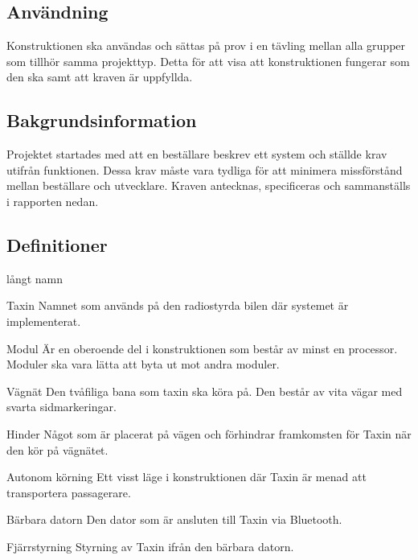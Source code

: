 \documentclass[kravspec/krav.tex]{subfiles}
\begin{document}
\subsection{Användning}
Konstruktionen ska användas och sättas på prov i en tävling mellan alla grupper som tillhör samma projekttyp. Detta för att visa att konstruktionen fungerar som den ska samt att kraven är uppfyllda.

\subsection{Bakgrundsinformation}
Projektet startades med att en beställare beskrev ett system och ställde krav
utifrån funktionen. Dessa krav måste vara tydliga för att minimera missförstånd
mellan beställare och utvecklare. Kraven antecknas, specificeras och
sammanställs i rapporten nedan.

\subsection{Definitioner}
\begin{labeling}{långt namn}
    \item[Taxin] Namnet som används på den radiostyrda bilen där systemet är
    implementerat.
    \item[Modul] Är en oberoende del i konstruktionen som består av minst en
    processor. Moduler ska vara lätta att byta ut mot andra moduler.
    \item[Vägnät] Den tvåfiliga bana som taxin ska köra på. Den består av vita
    vägar med svarta sidmarkeringar.
    \item[Hinder] Något som är placerat på vägen och förhindrar framkomsten för
    Taxin när den kör på vägnätet.
    \item[Autonom körning] Ett visst läge i konstruktionen där Taxin är menad
    att transportera passagerare.
    \item[Bärbara datorn] Den dator som är ansluten till Taxin via Bluetooth.
    \item[Fjärrstyrning] Styrning av Taxin ifrån den bärbara datorn. 
\end{labeling}
\end{document}
